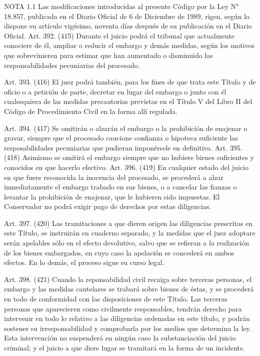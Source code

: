 NOTA 1.1
      Las modificaciones introducidas al presente Código por la Ley N° 18.857, publicada en el Diario Oficial de 6 de Diciembre de 1989, rigen, según lo dispone su artículo vigésimo, noventa días después de su publicación en el Diario Oficial.
    Art. 392. (415) Durante el juicio podrá el tribunal que actualmente conociere de él, ampliar o reducir el embargo y demás medidas, según los motivos que sobrevinieren para estimar que han aumentado o disminuido las responsabilidades pecuniarias del procesado.

    Art. 393. (416) El juez podrá también, para los fines de que trata este Título y de oficio o a petición de parte, decretar en lugar del embargo o junto con él cualesquiera de las medidas precautorias previstas en el Título V del Libro II del Código de Procedimiento Civil en la forma allí regulada.

    Art. 394. (417) Se omitirán o alzarán el embargo o la prohibición de enajenar o gravar, siempre que el procesado caucione confianza o hipoteca suficiente las resposabilidades pecuniarias que pudieran imponérsele en definitiva.
    Art. 395. (418) Asimismo se omitirá el embargo siempre que no hubiere bienes suficientes y conocidos en que hacerlo efectivo.
    Art. 396. (419) En cualquier estado del juicio en que fuere reconocida la inocencia del procesado, se procederá a alzar inmediatamente el embargo trabado en sus bienes, o a cancelar las fianzas o levantar la prohibición de enajenar, que le hubieren sido impuestas.
    El Conservador no podrá exigir pago de derechos por estas diligencias.

    Art. 397. (420) Las tramitaciones a que dieren origen las diligencias prescritas en este Título, se instruirán en cuaderno separado, y la medidas que el juez adoptare serán apelables sólo en el efecto devolutivo, salvo que se refieran a la realización de los bienes embargados, en cuyo caso la apelación se concederá en ambos efectos. En lo demás, el proceso sigue su curso legal.

    Art. 398. (421) Cuando la reponsabilidad civil recaiga sobre terceras personas, el embargo y las medidas cautelares se trabará sobre bienes de éstas, y se procederá en todo de conformidad con las disposiciones de este Título.
    Las terceras personas que aparecieren como civilmente responsables, tendrán derecho para intervenir en todo lo relativo a las diligencias ordenadas en este título, y podrán sostener su irresponsabilidad y comprobarla por los medios que determina la ley.
    Esta intervención no suspenderá en ningún caso la substanciación del juicio criminal; y el juicio a que diere lugar se tramitará en la forma de un incidente.

